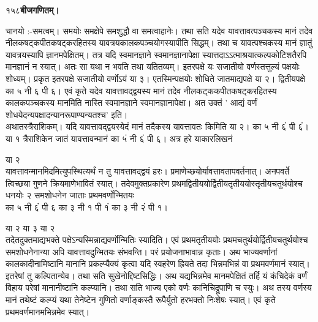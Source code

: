 \documentclass[11pt, openany]{book}
\begin{document}
\onehalfspacing
 १५८\hspace{2in}\textbf{बीजगणितम्।} 

\vspace{5mm}

\begin{sloppypar}
\hangindent=0.2in चानयो :-समत्वम्। समयोः समक्षेपे समशुद्धौ वा समत्वाहानेः। तथा सति यदेव यावत्तावत्पञ्चकस्य मानं तदेव नीलकषट्कपीतकषट्करहितस्य यावत्रयकालकपञ्चयोगस्यापीति सिद्धम्। तथा च यावत्पश्चकस्य मानं ज्ञातुं यावत्रयस्यापि ज्ञानमपेक्षितम्। तत्र यदि स्वमानज्ञाने स्वमानज्ञानापेक्षा स्यात्तदाऽऽत्माश्रयात्कल्पकोटिशतैरपि मानज्ञानं न स्यात्। अतः सा यथा न भवति तथा यतितव्यम्। इतरपक्षे यः सजातीयो वर्णस्तत्तुल्यं पक्षयोः शोध्यम्। प्रकृत इतरपक्षे सजातीयो वर्णोऽयं या ३। एतस्मिन्पक्षयोः शोधिते जातमाद्यपक्षे या २। द्वितीयपक्षे का ५ नी ६ पी ६। एवं कृते यदेव यावत्तावद्द्वयस्य मानं तदेव नीलकट्ककपीतकषट्करहितस्य कालकपञ्चकस्य मानमिति नास्ति स्वमानज्ञाने स्वमानज्ञानापेक्षा। अत उक्तं ' आद्यं वर्णं शोधयेदन्यपक्षादन्यानरूपाण्यन्यतश्च' इति।\\

\hangindent=0.2in \hspace{0.2in}अथातस्त्रैराशिकम्। यदि यावत्तावद्द्वयस्येदं मानं तदैकस्य यावत्तावतः किमिति या २। का ५ नी ६ं पी ६ं। या १ त्रैराशिकेन जातं यावत्तावन्मानं का ५ं नी ६ं पी ६। अत्र हरे याकारलिखनं 

\hspace{3.65in}या २\\

\hangindent=0.2in यावत्तावन्मानमिदमित्युपस्थित्यर्थं न तु यावत्तावद्द्वयं हरः। प्रमाणेच्छयोर्यावत्तावतापवर्तनात्। अनपवर्ते त्विच्छया गुणने क्रियमाणेभावितं स्यात्। तदेवमुक्तप्रकारेण प्रथमद्वितीययोर्द्वितीयतृतीययोस्तृतीयचतुर्थयोश्च धनयोः २ समशोधनेन जाताः प्रथमवर्णोन्मितयः\\

\hspace{0.5in}का ५ नी ६ं पी ६ \hspace{0.5in} का ३ नी १ पी १ं \hspace{0.5in} का ३ नी २ं पी १।

\hspace{1.3in}या २\hspace{1.3in} या ३\hspace{1.3in} या २\\

\hangindent=0.2in \hspace{0.2in}तदेतदुक्तमाद्यभक्ते पक्षेऽन्यस्मिन्नाद्यवर्णोन्मितिः स्यादिति। एवं प्रथमतृतीययोः प्रथमचतुर्थयोर्द्वितीयचतुर्थयोश्च समशोधनेनान्या अपि यावत्तावदुन्मितयः संभवन्ति। परं प्रयोजनाभावान्न कृताः। अथ भाज्यवर्णानां कालकादीनामिष्टानि मानानि प्रकल्प्यैक्यं कृत्वा यदि स्वहरेण ह्रियते तदा भिन्नमभिन्नं वा प्रथमवर्णमानं स्यात्। इतरेषां तु कल्पितान्येव। तथा सति सुखेनोद्दिष्टसिद्धिः। अथ यद्यभिन्नमेव मानमपेक्षितं तर्हि यं कंचिदेकं वर्णं विहाय परेषां मानानीष्टानि कल्प्यानि। तथा सति भाज्य एको वर्णः कानिचिद्रूपाणि च स्युः। अथ तस्य वर्णस्य मानं तथेष्टं कल्प्यं यथा तेनेष्टेन गुणितो वर्णाङ्कस्तै रूपैर्युतो हरभक्तो निःशेषः स्यात्। एवं कृते प्रथमवर्णमानमभिन्नमेव स्यात्।\\


\end{sloppypar}
\end{document}
